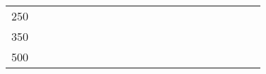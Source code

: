 % 
\begin{tabular}{ccccccccccccccccccccc}
  \hline
  \hline
250 &  &  &  &  &  &  &  &  &  &  &  &  &  &  &  &  &  &  &  &  \\ 
  350 &  &  &  &  &  &  &  &  &  &  &  &  &  &  &  &  &  &  &  &  \\ 
  500 &  &  &  &  &  &  &  &  &  &  &  &  &  &  &  &  &  &  &  &  \\ 
   \hline
\end{tabular}
